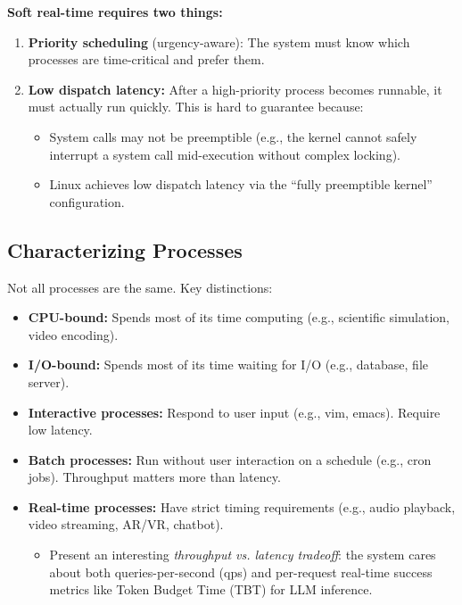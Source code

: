 \documentclass[11pt]{article}
\begin{document}
\textbf{Soft real-time requires two things:}
\begin{enumerate}
    \item \textbf{Priority scheduling} (urgency-aware): The system must know which processes are time-critical and prefer them.
    \item \textbf{Low dispatch latency:} After a high-priority process becomes runnable, it must actually run quickly. This is hard to guarantee because:
    \begin{itemize}
        \item System calls may not be preemptible (e.g., the kernel cannot safely interrupt a system call mid-execution without complex locking).
        \item Linux achieves low dispatch latency via the ``fully preemptible kernel'' configuration.
    \end{itemize}
\end{enumerate}

\subsection{Characterizing Processes}

Not all processes are the same. Key distinctions:

\begin{itemize}
    \item \textbf{CPU-bound:} Spends most of its time computing (e.g., scientific simulation, video encoding).
    \item \textbf{I/O-bound:} Spends most of its time waiting for I/O (e.g., database, file server).
    \item \textbf{Interactive processes:} Respond to user input (e.g., vim, emacs). Require low latency.
    \item \textbf{Batch processes:} Run without user interaction on a schedule (e.g., cron jobs). Throughput matters more than latency.
    \item \textbf{Real-time processes:} Have strict timing requirements (e.g., audio playback, video streaming, AR/VR, chatbot).
    \begin{itemize}
        \item Present an interesting \emph{throughput vs. latency tradeoff}: the system cares about both queries-per-second (qps) and per-request real-time success metrics like Token Budget Time (TBT) for LLM inference.
    \end{itemize}
\end{itemize}
\end{document}
